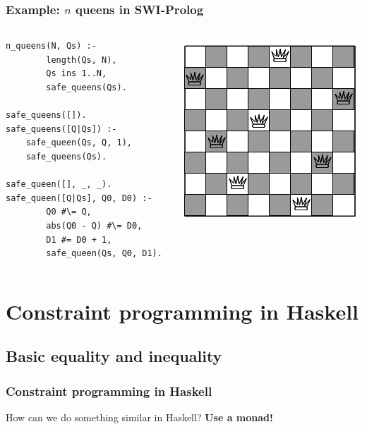 \documentclass[aspectratio=169,hyphens]{beamer} %
\begin{document}
\begin{frame}[fragile]
    \frametitle{Example: $n$ queens in SWI-Prolog}

\begin{columns}[t]
\column[c]{0.35\paperwidth}
\begin{verbatim}
n_queens(N, Qs) :-
        length(Qs, N),
        Qs ins 1..N,
        safe_queens(Qs).

safe_queens([]).
safe_queens([Q|Qs]) :-
    safe_queen(Qs, Q, 1),
    safe_queens(Qs).

safe_queen([], _, _).
safe_queen([Q|Qs], Q0, D0) :-
        Q0 #\= Q,
        abs(Q0 - Q) #\= D0,
        D1 #= D0 + 1,
        safe_queen(Qs, Q0, D1).
\end{verbatim}
\column[c]{0.5\paperwidth}
\includegraphics[width=0.45\paperwidth]{8queens.png}
\end{columns}
\end{frame}

\section{Constraint programming in Haskell}

\subsection{Basic equality and inequality}

\begin{frame}[fragile]
    \frametitle{Constraint programming in Haskell}
How can we do something similar in Haskell?\pause{}
\textbf{Use a monad!}
\end{frame}
\end{document}
